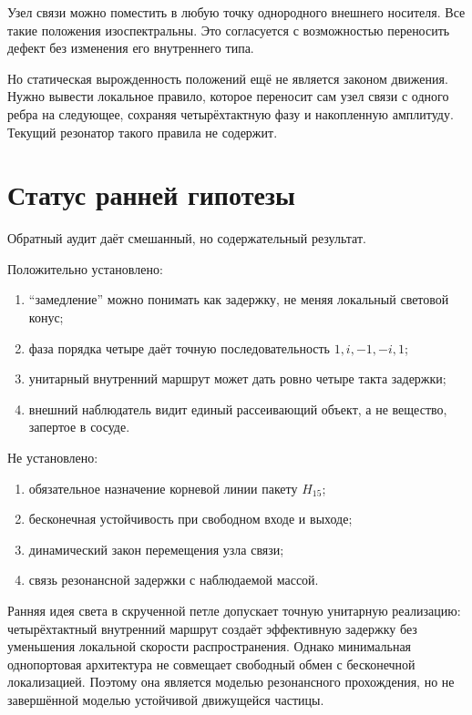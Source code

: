 Узел связи можно поместить в любую точку однородного внешнего носителя.
Все такие положения изоспектральны. Это согласуется с возможностью
переносить дефект без изменения его внутреннего типа.

Но статическая вырожденность положений ещё не является законом движения.
Нужно вывести локальное правило, которое переносит сам узел связи с одного
ребра на следующее, сохраняя четырёхтактную фазу и накопленную амплитуду.
Текущий резонатор такого правила не содержит.

\section{Статус ранней гипотезы}

Обратный аудит даёт смешанный, но содержательный результат.

Положительно установлено:
\begin{enumerate}
 \item ``замедление'' можно понимать как задержку, не меняя локальный
 световой конус;
 \item фаза порядка четыре даёт точную последовательность
 $1,i,-1,-i,1$;
 \item унитарный внутренний маршрут может дать ровно четыре такта задержки;
 \item внешний наблюдатель видит единый рассеивающий объект, а не вещество,
 запертое в сосуде.
\end{enumerate}

Не установлено:
\begin{enumerate}
 \item обязательное назначение корневой линии пакету $H_{15}$;
 \item бесконечная устойчивость при свободном входе и выходе;
 \item динамический закон перемещения узла связи;
 \item связь резонансной задержки с наблюдаемой массой.
\end{enumerate}

\begin{theorem}
Ранняя идея света в скрученной петле допускает точную унитарную
реализацию: четырёхтактный внутренний маршрут создаёт эффективную задержку
без уменьшения локальной скорости распространения. Однако минимальная
однопортовая архитектура не совмещает свободный обмен с бесконечной
локализацией. Поэтому она является моделью резонансного прохождения, но не
завершённой моделью устойчивой движущейся частицы.
\end{theorem}

